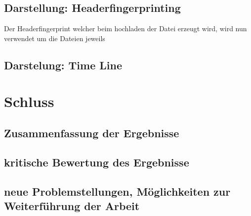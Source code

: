 \documentclass[
    fontsize=12pt,
    headings=small,
    parskip=half,           %
    bibliography=totoc,
    numbers=noenddot,       %
    open=any,               %
    ]{scrreprt}
\begin{document}
\section{Darstellung: Headerfingerprinting}

Der Headerfingerprint welcher beim hochladen der Datei erzeugt wird, wird nun verwendet um die Dateien jeweils  

\section{Darstelung: Time Line}

\chapter{Schluss}

\section{Zusammenfassung der Ergebnisse}
\section{kritische Bewertung des Ergebnisse}
\section{neue Problemstellungen, Möglichkeiten zur Weiterführung der Arbeit}
\end{document}
